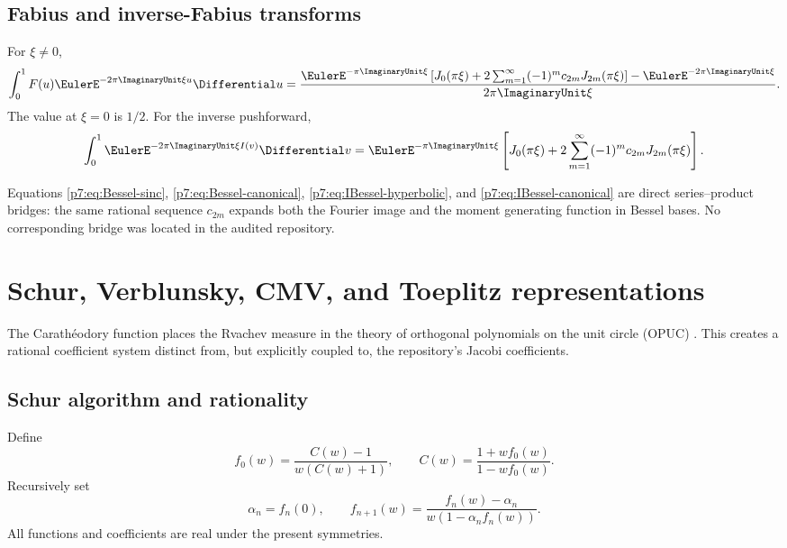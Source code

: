 \documentclass[11pt]{article}
\theoremstyle{definition}
\theoremstyle{remark}
\begin{document}
\subsection{Fabius and inverse-Fabius transforms}

For \(\xi\ne0\),
\begin{equation}
 \int_0^1F(u)\EulerE^{-2\pi\ImaginaryUnit\xi u}\Differential u
 =\frac{\EulerE^{-\pi\ImaginaryUnit\xi}
 \left[J_0(\pi\xi)+2\sum_{m=1}^{\infty}(-1)^mc_{2m}J_{2m}(\pi\xi)\right]
 -\EulerE^{-2\pi\ImaginaryUnit\xi}}{2\pi\ImaginaryUnit\xi}.
 \label{p7:eq:F-Bessel-transform}
\end{equation}
The value at \(\xi=0\) is \(1/2\). For the inverse pushforward,
\begin{equation}
 \int_0^1\EulerE^{-2\pi\ImaginaryUnit\xi I(v)}\Differential v
 =\EulerE^{-\pi\ImaginaryUnit\xi}\left[J_0(\pi\xi)+2\sum_{m=1}^{\infty}(-1)^mc_{2m}J_{2m}(\pi\xi)\right].
 \label{p7:eq:I-Bessel-transform}
\end{equation}

\begin{novelbox}
Equations \eqref{p7:eq:Bessel-sinc}, \eqref{p7:eq:Bessel-canonical},
\eqref{p7:eq:IBessel-hyperbolic}, and \eqref{p7:eq:IBessel-canonical} are direct series--product
bridges: the same rational sequence \(c_{2m}\) expands both the Fourier image and the moment
generating function in Bessel bases. No corresponding bridge was located in the audited
repository.
\end{novelbox}

\section{Schur, Verblunsky, CMV, and Toeplitz representations}
\label{p7:sec:opuc}

The Carath\'eodory function places the Rvachev measure in the theory of orthogonal
polynomials on the unit circle (OPUC) \cite{p7:SimonOPUC1,p7:SimonOneFoot}. This creates a rational
coefficient system distinct from, but explicitly coupled to, the repository's Jacobi
coefficients.

\subsection{Schur algorithm and rationality}

Define
\begin{equation}
 f_0(w)=\frac{C(w)-1}{w(C(w)+1)},
 \qquad C(w)=\frac{1+wf_0(w)}{1-wf_0(w)}.
 \label{p7:eq:Schur-first}
\end{equation}
Recursively set
\begin{equation}
 \alpha_n=f_n(0),\qquad
 f_{n+1}(w)=\frac{f_n(w)-\alpha_n}{w(1-\alpha_nf_n(w))}.
 \label{p7:eq:Schur-recursion}
\end{equation}
All functions and coefficients are real under the present symmetries.
\end{document}
